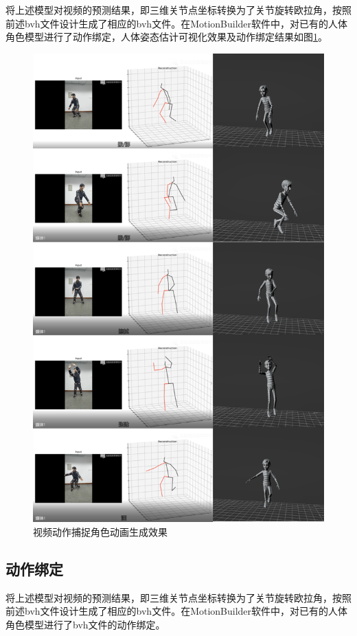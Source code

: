 将上述模型对视频的预测结果，即三维关节点坐标转换为了关节旋转欧拉角，按照前述bvh文件设计生成了相应的bvh文件。在MotionBuilder软件中，对已有的人体角色模型进行了动作绑定，人体姿态估计可视化效果及动作绑定结果如图\ref{fig:f31}。

\begin{figure}[h]
	\centering
	\includegraphics[scale=1]{figures/31.png}
	\caption{视频动作捕捉角色动画生成效果}
	\label{fig:f31}
\end{figure}



\subsection{动作绑定}{}
将上述模型对视频的预测结果，即三维关节点坐标转换为了关节旋转欧拉角，按照前述bvh文件设计生成了相应的bvh文件。在MotionBuilder软件中，对已有的人体角色模型进行了bvh文件的动作绑定。